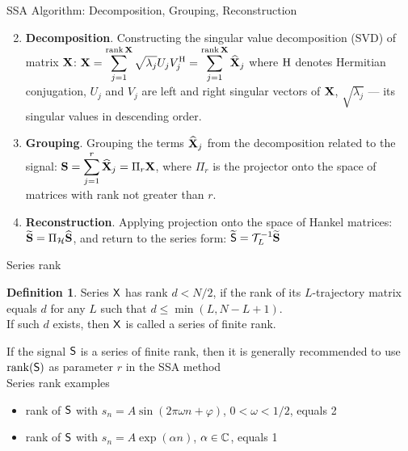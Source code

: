 \documentclass[pdf, unicode, ucs, notheorems]{beamer}
\theoremstyle{definition}
\newtheorem{definition}{Definition}
\begin{document}
\begin{frame}{SSA Algorithm: Decomposition, Grouping, Reconstruction}
  \begin{enumerate}
      \setcounter{enumi}{1}
    \item \textbf{Decomposition}.
      Constructing the singular value decomposition (SVD) of matrix $\mathbf{X}$:
      $\displaystyle \mathbf{X} = \sum_{j=1}^{\operatorname{rank}\mathbf{X}}
      \sqrt{\lambda_j} U_j V_j^{\mathrm{H}} =
      \sum_{j=1}^{\operatorname{rank}\mathbf{X}} \widehat{\mathbf{X}}_j$
      where $\mathrm{H}$ denotes Hermitian
      conjugation, $U_j$ and $V_j$ are left and right singular vectors
      of $\mathbf{X}$, $\sqrt{\lambda_j}$ --- its singular values in
      descending order.
      \vspace{0.2cm}\\
    \item \textbf{Grouping}. Grouping the terms $\widehat{\mathbf{X}}_j$
      from the decomposition related to the signal:
      $\displaystyle \mathbf{S} = \sum_{j=1}^{r}\widehat{\mathbf{X}}_j = \Pi_r \mathbf{X}$,
      where $\Pi_r$ is the projector onto the space of matrices with
      rank not greater than $r$.
      \vspace{0.2cm}
    \item \textbf{Reconstruction}. Applying projection onto the
      space of Hankel
      matrices: $\widetilde{\mathbf{S}}= \Pi_{\mathcal{H}}\widehat{\mathbf{S}}$,
      and return to the series form: $\widetilde{\mathsf{S}}= \mathcal{T}_{L}^{-1}
      \widetilde{\mathbf{S}}$
  \end{enumerate}
\end{frame}

\begin{frame}{Series rank}
  \begin{definition}
    Series $\mathsf{X}$ has rank $d < N/2$, if the rank of its $L$-trajectory
    matrix equals $d$ for any $L$ such that $d \leqslant \min(L,
    N - L + 1)$.\\
    If such $d$ exists, then $\mathsf{X}$ is called a series of finite rank.
  \end{definition}
  \vspace{0.5cm}
  If the signal $\mathsf{S}$ is a series of finite rank, then it is
  generally recommended to use $\operatorname{rank}(\mathsf{S})$ as
  parameter $r$ in the SSA method
  \vspace{0.4cm}\\
  Series rank examples
  \begin{itemize}
    \item rank of $\mathsf{S}$ with $s_n = A\sin(2\pi \omega n + \varphi)$,
      $0 < \omega < 1/2$, equals 2
    \item rank of $\mathsf{S}$ with $s_n = A \exp(\alpha n)$, $\alpha
      \in\mathbb{C}$, equals 1
  \end{itemize}
\end{frame}
\end{document}

